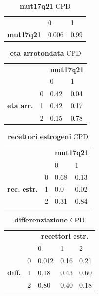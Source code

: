 \begin{table}[htbp]
\centering
\caption{\textbf{mut17q21} CPD}
\begin{tabularx}{\textwidth/2}{cXX}
\toprule
& 0 & 1    \\ 
\textbf{mut17q21} & 0.006 & 0.99  \\
\bottomrule
\end{tabularx}
\label{tab:mut-cpd-issues}
\end{table}

\begin{table}[htbp]
\centering
\caption{\textbf{eta arrotondata} CPD}
\begin{tabularx}{\textwidth/2}{ccXX}
\toprule
      & &  \multicolumn{2}{c}{\textbf{mut17q21}} \\
\cmidrule(lr){3-4}
 & & 0 & 1    \\ 
 \multirow{3}{*}{\textbf{eta arr.}}  & 0 & 0.42 & 0.04  \\
 & 1 & 0.42 & 0.17    \\
 & 2 & 0.15 & 0.78 \\
\bottomrule
\end{tabularx}
\label{tab:eta-cpd-issues}
\end{table}

\begin{table}[htbp]
\centering
\caption{\textbf{recettori estrogeni} CPD}
\begin{tabularx}{\textwidth/2}{ccXX}
\toprule
      & &  \multicolumn{2}{c}{\textbf{mut17q21}} \\
\cmidrule(lr){3-4}
 & & 0 & 1    \\ 
 \multirow{3}{*}{\textbf{rec. estr.}}  & 0 & 0.68 & 0.13  \\
 & 1 & 0.0 & 0.02    \\
 & 2 & 0.31 & 0.84 \\
\bottomrule
\end{tabularx}
\label{tab:rec-cpd-issues}
\end{table}

\begin{table}[htbp]
\centering
\caption{\textbf{differenziazione} CPD}
\begin{tabularx}{\textwidth/2}{ccXXX}
\toprule
      & &  \multicolumn{3}{c}{\textbf{recettori estr.}} \\
\cmidrule(lr){3-5}
 & & 0 & 1 & 2   \\ 
 \multirow{3}{*}{\textbf{diff.}}  & 0 & 0.012 & 0.16 & 0.21  \\
 & 1 & 0.18 & 0.43 & 0.60    \\
 & 2 & 0.80 & 0.40 & 0.18 \\
\bottomrule
\end{tabularx}
\label{tab:diff-cpd-issues}
\end{table}
